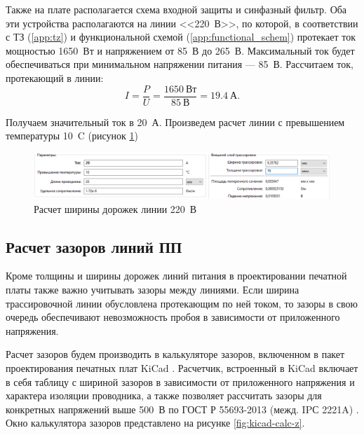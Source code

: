 \documentclass[utf8x, 14pt, oneside, a4paper]{article}
\begin{document}
		Также на плате располагается схема входной защиты и синфазный фильтр. Оба эти устройства располагаются на линии <<220~В>>, по которой, в соответствии с ТЗ (\ref{app:tz}) и функциональной схемой (\ref{app:functional_schem}) протекает ток мощностью 1650~Вт и напряжением от 85~В до 265~В. Максимальный ток будет обеспечиваться при минимальном напряжении питания --- 85~В. Рассчитаем ток, протекающий в линии:
		\begin{equation}
			I = \frac{P}{U} = \frac{1650~\text{Вт}}{85~\text{В}} = 19.4~\text{А}.
		\end{equation}
	
		Получаем значительный ток в 20~А. Произведем расчет линии с превышением температуры 10~{\textdegree}C (рисунок \ref{fig:kicad-calc-trassing-220})
		
		\begin{figure}[H]
			\centering
			\includegraphics[width=1\linewidth]{"Рисунки/KiCad-calc-trassing-220"}
			\caption{Расчет ширины дорожек линии 220~В}
			\label{fig:kicad-calc-trassing-220}
		\end{figure}
	
		\subsection{Расчет зазоров линий ПП}
		
		Кроме толщины и ширины дорожек линий питания в проектировании печатной платы также важно учитывать зазоры между линиями. Если ширина трассировочной линии обусловлена протекающим по ней током, то зазоры в свою очередь обеспечивают невозможность пробоя в зависимости от приложенного напряжения.
		
		Расчет зазоров будем производить в калькуляторе зазоров, включенном в пакет проектирования печатных плат KiCad \cite{bib:kicad}. Расчетчик, встроенный в KiCad включает в себя таблицу с шириной зазоров в зависимости от приложенного напряжения и характера изоляции проводника, а также позволяет рассчитать зазоры для конкретных напряжений выше 500~В по ГОСТ Р 55693-2013 (межд. IPС 2221A) \cite{bib:gost_55693}. Окно калькулятора зазоров представлено на рисунке \ref{fig:kicad-calc-z}.
		
\end{document}
